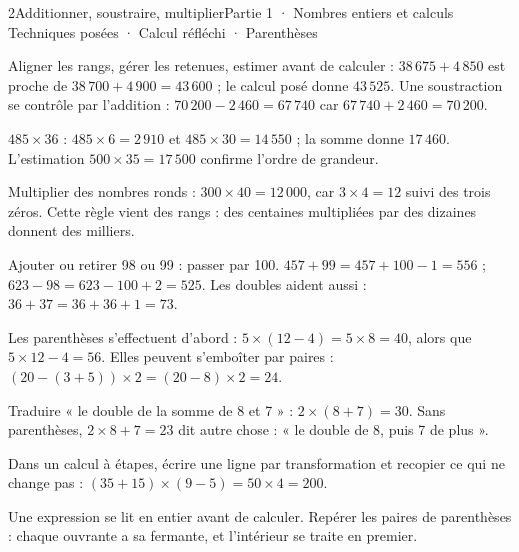 \begin{ouverture}[calcul]{2}{Additionner, soustraire, multiplier}{Partie 1 · Nombres entiers et calculs}
{Techniques posées · Calcul réfléchi · Parenthèses}
\end{ouverture}
\pagestyle{otMain}\essentiel\fontsize{11}{15}\selectfont
{}\label{cours-2-1}
\begin{savoirfaire}Aligner les rangs, gérer les retenues, estimer avant de calculer : $38\,675+4\,850$ est proche de $38\,700+4\,900=43\,600$ ; le calcul posé donne $43\,525$. Une soustraction se contrôle par l’addition : $70\,200-2\,460=67\,740$ car $67\,740+2\,460=70\,200$.\end{savoirfaire}
\begin{exemple}$485\times36$ : $485\times6=2\,910$ et $485\times30=14\,550$ ; la somme donne $17\,460$. L’estimation $500\times35=17\,500$ confirme l’ordre de grandeur.\end{exemple}
\begin{propriete}Multiplier des nombres ronds : $300\times40=12\,000$, car $3\times4=12$ suivi des trois zéros. Cette règle vient des rangs : des centaines multipliées par des dizaines donnent des milliers.\end{propriete}
\begin{savoirfaire}Ajouter ou retirer 98 ou 99 : passer par 100. $457+99=457+100-1=556$ ; $623-98=623-100+2=525$. Les doubles aident aussi : $36+37=36+36+1=73$.\end{savoirfaire}
\clearpage
{}\label{cours-2-2}
\begin{definition}Les parenthèses s’effectuent d’abord : $5\times(12-4)=5\times8=40$, alors que $5\times12-4=56$. Elles peuvent s’emboîter par paires : $(20-(3+5))\times2=(20-8)\times2=24$.\end{definition}
\begin{exemple}Traduire « le double de la somme de 8 et 7 » : $2\times(8+7)=30$. Sans parenthèses, $2\times8+7=23$ dit autre chose : « le double de 8, puis 7 de plus ».\end{exemple}
\begin{savoirfaire}Dans un calcul à étapes, écrire une ligne par transformation et recopier ce qui ne change pas : $(35+15)\times(9-5)=50\times4=200$.\end{savoirfaire}
\begin{attention}Une expression se lit en entier avant de calculer. Repérer les paires de parenthèses : chaque ouvrante a sa fermante, et l’intérieur se traite en premier.\end{attention}


